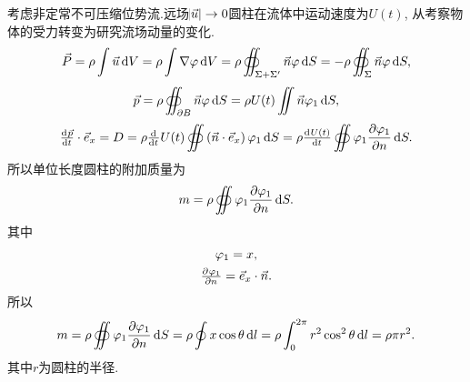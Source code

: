 \documentclass[12pt]{article}
\begin{document}
考虑非定常不可压缩位势流.远场$\abs{\vec{u}} \to 0$圆柱在流体中运动速度为$U(t)$, 从考察物体的受力转变为研究流场动量的变化.
\begin{equation}
	\vec{P}=\rho \int \vec{u} \dif V=\rho \int \nabla \varphi \dif V = \rho \oiint_{\Sigma + \Sigma'} \vec{n} \varphi \dif S = - \rho \oiint_{\Sigma} \vec{n} \varphi \dif S,
\end{equation}
\begin{equation}
	\vec{p}=\rho \oiint_{\partial B} \vec{n} \varphi \dif S=\rho U(t) \iint \vec{n} \varphi_{1} \dif S,
\end{equation}
\begin{equation}
	\od{\vec{p}}{t}  \cdot \vec{e}_{x}=D=\rho \od{}{t} U(t) \oiint \left(\vec{n} \cdot \vec{e}_{x}\right) \varphi_{1} \dif S = \rho \od{ U(t)}{ t} \oiint \varphi_{1} \frac{\partial \varphi_{1}}{\partial n} \dif S.
\end{equation}
所以单位长度圆柱的附加质量为
\begin{equation}
	m = \rho \oiint \varphi_{1} \frac{\partial \varphi_{1}}{\partial n} \dif S.
\end{equation}
其中
\begin{gather}
	\varphi_1 = x,\\
	\pd{\varphi_1}{n} = \vec{e}_x \cdot \vec{n}.
\end{gather}
所以
\begin{equation}
	m = \rho \oiint \varphi_{1} \frac{\partial \varphi_{1}}{\partial n} \dif S = \rho \oint x \cos \theta \dif l = \rho \int_0^{2\pi} r^2 \cos^2 \theta \dif l = \rho \pi r^2.
\end{equation}
其中$r$为圆柱的半径.

\nocite{*}


\end{document}
